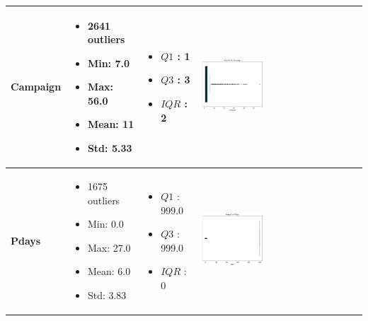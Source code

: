 \documentclass{article}
\begin{document}
\begin{longtable}{|p{}|p{}|p{}|p{}|}
            \hline
            \textbf{Campaign} & 
            \begin{itemize}
                \item 2641 outliers
                \item Min: 7.0
                \item Max: 56.0
                \item Mean: 11
                \item Std: 5.33
            \end{itemize} & 
            \begin{itemize}
                \item $Q1$ : 1
                \item $Q3$ : 3
                \item $IQR$ : 2
            \end{itemize} &
            \includegraphics[width=0.40\textwidth]{data/bank_marketing/pic/Outlier/Campaign_Add.png} \\
            \hline
            \textbf{Pdays} & 
            \begin{itemize}
                \item 1675 outliers
                \item Min: 0.0
                \item Max: 27.0
                \item Mean: 6.0
                \item Std: 3.83
            \end{itemize} & 
            \begin{itemize}
                \item $Q1$ : 999.0
                \item $Q3$ : 999.0
                \item $IQR$ : 0
            \end{itemize} &
            \includegraphics[width=0.40\textwidth]{data/bank_marketing/pic/Outlier/Pdays_Add.png} \\

\end{longtable}
\end{document}
